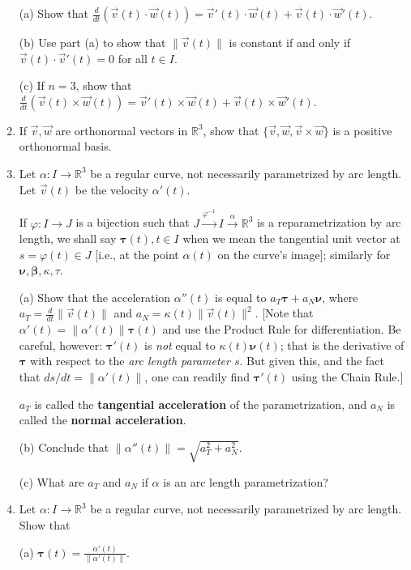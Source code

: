 \documentclass[leqno]{book}
\begin{document}
\begin{enumerate}
(a) Show that $\frac{d}{dt}(\vec v(t)\cdot\vec w(t))=\vec v'(t)\cdot\vec w(t)+\vec v(t)\cdot\vec w'(t)$.

(b) Use part (a) to show that $\|\vec v(t)\|$ is constant if and only if $\vec v(t)\cdot\vec v'(t)=0$ for all $t\in I$.

(c) If $n=3$, show that $\frac{d}{dt}(\vec v(t)\times\vec w(t))=\vec v'(t)\times\vec w(t)+\vec v(t)\times\vec w'(t)$.

\item If $\vec v,\vec w$ are orthonormal vectors in $\mathbb R^3$, show that $\{\vec v,\vec w,\vec v\times\vec w\}$ is a positive orthonormal basis.

\item Let $\alpha:I\to\mathbb R^3$ be a regular curve, not necessarily parametrized by arc length.  Let $\vec v(t)$ be the velocity $\alpha'(t)$.

If $\varphi:I\to J$ is a bijection such that $J\overset{\varphi^{-1}}\to I\overset{\alpha}\to\mathbb R^3$ is a reparametrization by arc length, we shall say $\boldsymbol\tau(t),t\in I$ when we mean the tangential unit vector at $s=\varphi(t)\in J$ [i.e., at the point $\alpha(t)$ on the curve's image]; similarly for $\boldsymbol\nu,\boldsymbol\beta,\kappa,\tau$.

(a) Show that the acceleration $\alpha''(t)$ is equal to $a_T\boldsymbol\tau+a_N\boldsymbol\nu$, where $a_T=\frac d{dt}\|\vec v(t)\|$ and $a_N=\kappa(t)\|\vec v(t)\|^2$.  [Note that $\alpha'(t)=\|\alpha'(t)\|\boldsymbol\tau(t)$ and use the Product Rule for differentiation.  Be careful, however: $\boldsymbol\tau'(t)$ is \emph{not} equal to $\kappa(t)\boldsymbol\nu(t)$; that is the derivative of $\boldsymbol\tau$ with respect to the \emph{arc length parameter $s$}.  But given this, and the fact that $ds/dt=\|\alpha'(t)\|$, one can readily find $\boldsymbol\tau'(t)$ using the Chain Rule.]

$a_T$ is called the \textbf{tangential acceleration} of the parametrization, and $a_N$ is called the \textbf{normal acceleration}.

(b) Conclude that $\|\alpha''(t)\|=\sqrt{a_T^2+a_N^2}$.

(c) What are $a_T$ and $a_N$ if $\alpha$ is an arc length parametrization?

\item Let $\alpha:I\to\mathbb R^3$ be a regular curve, not necessarily parametrized by arc length.  Show that

(a) $\boldsymbol\tau(t)=\frac{\alpha'(t)}{\|\alpha'(t)\|}$.


\end{enumerate}
\end{document}
